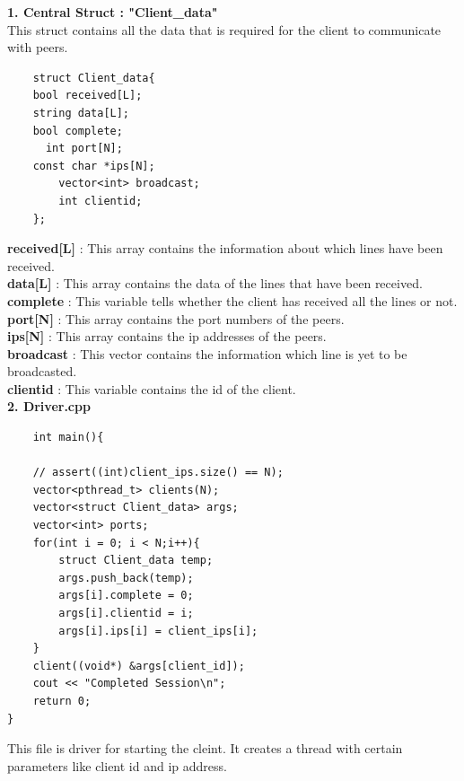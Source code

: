 \documentclass[12pt]{scrartcl}
\begin{document}
\textbf{1. Central Struct : "Client\_data"}\\
This struct contains all the data that is required for the client to communicate with peers.\\
\begin{verbatim}
    struct Client_data{
    bool received[L];
    string data[L];
    bool complete;
 	  int port[N];
    const char *ips[N];
	    vector<int> broadcast;
	    int clientid;
    };
\end{verbatim}
\textbf{received[L]} : This array contains the information about which lines have been received.\\
\textbf{data[L]} : This array contains the data of the lines that have been received.\\
\textbf{complete} : This variable tells whether the client has received all the lines or not.\\
\textbf{port[N]} : This array contains the port numbers of the peers.\\
\textbf{ips[N]} : This array contains the ip addresses of the peers.\\
\textbf{broadcast} : This vector contains the information which line is yet to be broadcasted.\\
\textbf{clientid} : This variable contains the id of the client.\\

\textbf{2. Driver.cpp}\\
\begin{verbatim}
    int main(){

    // assert((int)client_ips.size() == N);
    vector<pthread_t> clients(N);
    vector<struct Client_data> args;
    vector<int> ports;
    for(int i = 0; i < N;i++){
        struct Client_data temp;
        args.push_back(temp);
        args[i].complete = 0;
        args[i].clientid = i;
        args[i].ips[i] = client_ips[i];
    }
    client((void*) &args[client_id]);
    cout << "Completed Session\n";
    return 0;
}
\end{verbatim}
This file is driver for starting the cleint. It creates a thread with certain parameters like client id and ip address.\\
\end{document}
